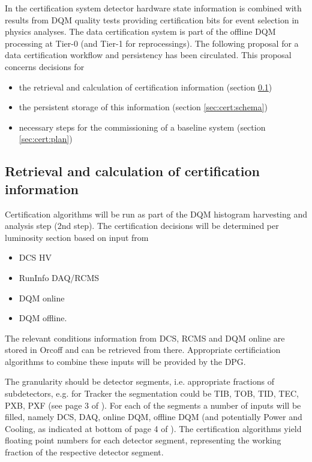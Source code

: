 
In the certification system detector hardware state information is combined with results 
from DQM quality tests providing certification bits for event selection in physics analyses.
The data certification system is part of the offline DQM processing at Tier-0 
(and Tier-1 for reprocessings). The following proposal for a data certification workflow and persistency has been circulated. This proposal concerns decisions for
\begin{itemize}
\item the retrieval and calculation of certification information (section \ref{sec:cert:calc})
\item the persistent storage of this information (section \ref{sec:cert:schema})
\item necessary steps for the commissioning of a baseline system (section \ref{sec:cert:plan})
\end{itemize}

  
\subsection{Retrieval and calculation of certification information}
\label{sec:cert:calc}

Certification algorithms will be run as part of the DQM histogram harvesting and analysis step (2nd step). The certification decisions will be determined per luminosity section based on input from
\begin{itemize}
\item DCS  HV
\item RunInfo DAQ/RCMS
\item DQM online
\item DQM offline.
\end{itemize}
        
The relevant conditions information from DCS, RCMS and DQM online are stored in Orcoff and can be retrieved from there. Appropriate certificiation algorithms to combine these inputs will  be provided by the DPG. 

The granularity should be detector segments, i.e. appropriate fractions of subdetectors, e.g. for Tracker the segmentation could be TIB, TOB, TID, TEC, PXB, PXF (see page 3 of \cite{datacert:gutsche}). For each of the segments a number of inputs will be filled, namely DCS, DAQ, online DQM, offline DQM (and potentially Power and Cooling, as indicated at bottom of page 4 of \cite{datacert:gutsche}).
The certification algorithms yield floating point numbers for each detector segment, representing the working fraction of the respective detector segment.
   
